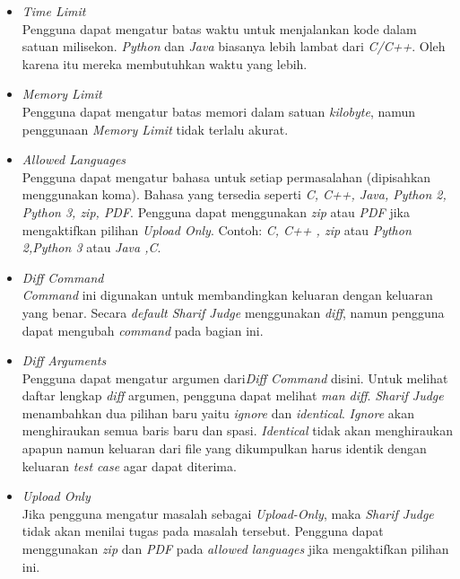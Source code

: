 \begin{itemize}
	\item \textit{Time Limit} \\
	Pengguna dapat mengatur batas waktu untuk menjalankan kode dalam satuan milisekon. \textit{Python} dan \textit{Java} biasanya lebih lambat dari \textit{C/C++}.	Oleh karena itu mereka membutuhkan waktu yang lebih.
	
	\item \textit{Memory Limit} \\
	Pengguna dapat mengatur batas memori dalam satuan \textit{kilobyte}, namun penggunaan \textit{Memory Limit} tidak terlalu akurat.
	
	\item \textit{Allowed Languages} \\
	Pengguna dapat mengatur bahasa untuk setiap permasalahan (dipisahkan menggunakan koma). Bahasa yang tersedia seperti \textit{C, C++, Java, Python 2, Python 3, zip, PDF}. Pengguna dapat menggunakan \textit{zip} atau \textit{PDF} jika mengaktifkan pilihan \textit{Upload Only}. Contoh: \textit{C, C++ , zip} atau \textit{Python 2,Python 3} atau \textit{Java ,C}.
	
	\item \textit{Diff Command} \\
	\textit{Command} ini digunakan untuk membandingkan keluaran dengan keluaran yang benar. Secara \textit{default Sharif Judge} menggunakan \textit{diff}, namun pengguna dapat mengubah \textit{command} pada bagian ini.
	
	\item \textit{Diff Arguments} \\
	Pengguna dapat mengatur argumen dari\textit{Diff Command} disini. Untuk melihat daftar lengkap \textit{diff} argumen, pengguna dapat melihat \textit{man diff}. \textit{Sharif Judge} menambahkan dua pilihan baru yaitu \textit{ignore} dan \textit{identical}. \textit{Ignore} akan menghiraukan semua baris baru dan spasi. \textit{Identical} tidak akan menghiraukan apapun namun keluaran dari file yang dikumpulkan harus identik dengan keluaran \textit{test case} agar dapat diterima.
	
	\item \textit{Upload Only} \\
	Jika pengguna mengatur masalah sebagai \textit{Upload-Only}, maka \textit{Sharif Judge} tidak akan menilai tugas pada masalah tersebut. Pengguna dapat menggunakan \textit{zip} dan \textit{PDF} pada \textit{allowed languages} jika mengaktifkan pilihan ini.
\end{itemize}

